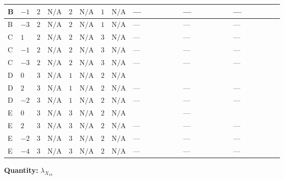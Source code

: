 \documentclass[8pt]{article}
\begin{document}
\begin{landscape}
\begin{longtable}{@{}llcccccc >{\raggedright\arraybackslash}p{0.21\linewidth} >{\raggedright\arraybackslash}p{0.21\linewidth} >{\raggedright\arraybackslash}p{0.21\linewidth}@{}}
\midrule
B & $-1$ & $2$ & $\text{N/A}$ & $2$ & $\text{N/A}$ & $1$ & $\text{N/A}$ & --- & --- & --- \\
\midrule
B & $-3$ & $2$ & $\text{N/A}$ & $2$ & $\text{N/A}$ & $1$ & $\text{N/A}$ & --- & --- & --- \\
\midrule
C & $1$ & $2$ & $\text{N/A}$ & $2$ & $\text{N/A}$ & $3$ & $\text{N/A}$ & --- & --- & --- \\
\midrule
C & $-1$ & $2$ & $\text{N/A}$ & $2$ & $\text{N/A}$ & $3$ & $\text{N/A}$ & --- & --- & --- \\
\midrule
C & $-3$ & $2$ & $\text{N/A}$ & $2$ & $\text{N/A}$ & $3$ & $\text{N/A}$ & --- & --- & --- \\
\midrule
D & $0$ & $3$ & $\text{N/A}$ & $1$ & $\text{N/A}$ & $2$ & $\text{N/A}$ & \scriptsize\adjustbox{max width=\linewidth}{$\begin{gathered} +{\lambda_{HS_1}^{(1)}} (10 {\lambda_{X_{9}}}+8 {\lambda_{X_{18}}})\end{gathered}$} & \scriptsize\adjustbox{max width=\linewidth}{$\begin{gathered} +2 {\lambda_{HS_2}^{(1)}} {\lambda_{X_{5}}^{(1)}}\end{gathered}$} & \scriptsize\adjustbox{max width=\linewidth}{$\begin{gathered} +2 {\lambda_{S_1}^{(1)}} {\lambda_{X_{18}}}\end{gathered}$} \\
\midrule
D & $2$ & $3$ & $\text{N/A}$ & $1$ & $\text{N/A}$ & $2$ & $\text{N/A}$ & --- & --- & --- \\
\midrule
D & $-2$ & $3$ & $\text{N/A}$ & $1$ & $\text{N/A}$ & $2$ & $\text{N/A}$ & --- & --- & --- \\
\midrule
E & $0$ & $3$ & $\text{N/A}$ & $3$ & $\text{N/A}$ & $2$ & $\text{N/A}$ & \scriptsize\adjustbox{max width=\linewidth}{$\begin{gathered} +{\lambda_{HS_1}^{(1)}} (10 {\lambda_{X_{9}}}+8 {\lambda_{X_{18}}})\end{gathered}$} & --- & \scriptsize\adjustbox{max width=\linewidth}{$\begin{gathered} +2 {\lambda_{S_1}^{(1)}} {\lambda_{X_{18}}}\end{gathered}$} \\
\midrule
E & $2$ & $3$ & $\text{N/A}$ & $3$ & $\text{N/A}$ & $2$ & $\text{N/A}$ & --- & --- & --- \\
\midrule
E & $-2$ & $3$ & $\text{N/A}$ & $3$ & $\text{N/A}$ & $2$ & $\text{N/A}$ & --- & --- & --- \\
\midrule
E & $-4$ & $3$ & $\text{N/A}$ & $3$ & $\text{N/A}$ & $2$ & $\text{N/A}$ & --- & --- & --- \\
\midrule
\bottomrule
\end{longtable}
\clearpage
\noindent\textbf{Quantity: }${\lambda_{X_{18}}}$\par\smallskip

\end{landscape}
\end{document}
